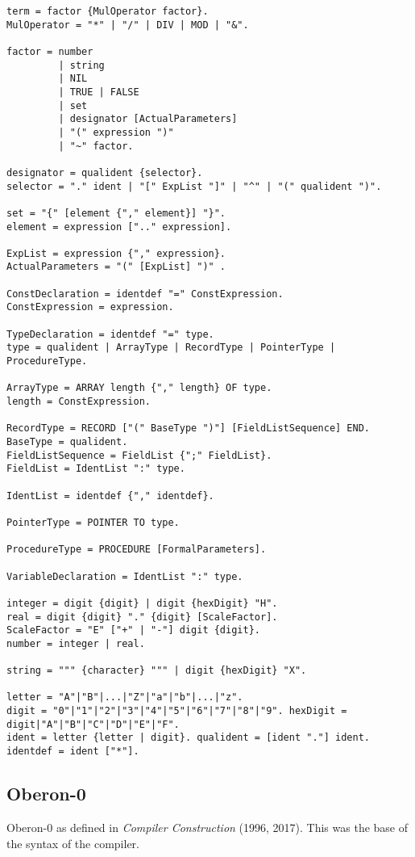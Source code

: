 \documentclass[12pt]{article}
\begin{document}
{\begin{lstlisting}[style=EBNF]
term = factor {MulOperator factor}. 
MulOperator = "*" | "/" | DIV | MOD | "&".

factor = number 
         | string 
         | NIL 
         | TRUE | FALSE 
         | set 
         | designator [ActualParameters] 
         | "(" expression ")" 
         | "~" factor. 
         
designator = qualident {selector}.
selector = "." ident | "[" ExpList "]" | "^" | "(" qualident ")".

set = "{" [element {"," element}] "}".
element = expression [".." expression]. 

ExpList = expression {"," expression}. 
ActualParameters = "(" [ExpList] ")" .

ConstDeclaration = identdef "=" ConstExpression. 
ConstExpression = expression.

TypeDeclaration = identdef "=" type.
type = qualident | ArrayType | RecordType | PointerType | ProcedureType. 

ArrayType = ARRAY length {"," length} OF type.
length = ConstExpression.

RecordType = RECORD ["(" BaseType ")"] [FieldListSequence] END. 
BaseType = qualident.
FieldListSequence = FieldList {";" FieldList}.
FieldList = IdentList ":" type.

IdentList = identdef {"," identdef}.

PointerType = POINTER TO type.

ProcedureType = PROCEDURE [FormalParameters].

VariableDeclaration = IdentList ":" type.

integer = digit {digit} | digit {hexDigit} "H". 
real = digit {digit} "." {digit} [ScaleFactor]. 
ScaleFactor = "E" ["+" | "-"] digit {digit}. 
number = integer | real.

string = """ {character} """ | digit {hexDigit} "X".

letter = "A"|"B"|...|"Z"|"a"|"b"|...|"z".
digit = "0"|"1"|"2"|"3"|"4"|"5"|"6"|"7"|"8"|"9". hexDigit = digit|"A"|"B"|"C"|"D"|"E"|"F".
ident = letter {letter | digit}. qualident = [ident "."] ident. identdef = ident ["*"].
\end{lstlisting}}

\subsection{Oberon-0}

Oberon-0 as defined in {\em Compiler Construction} (1996, 2017). This was the base of the syntax of the compiler.
\end{document}
